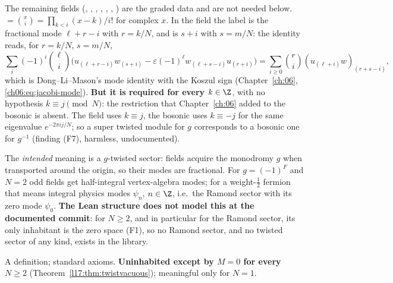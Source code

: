 \begin{dictionary}
The remaining fields (, , , ,
, , ) are the graded data and are not needed
below.  $=\binom xi=\prod_{k<i}(x-k)/i!$ for complex $x$. In the
 field the label  is the fractional mode $\ell+r-i$ with
$r=k/N$, and  is $s+i$ with $s=m/N$: the identity reads, for $r=k/N$, $s=m/N$,
\begin{equation*}
\sum_i(-1)^i\binom\ell i\bigl(u_{(\ell+r-i)}w_{(s+i)}-\varepsilon(-1)^\ell w_{(\ell+s-i)}u_{(r+i)}\bigr)
=\sum_{i\ge0}\binom ri(u_{(\ell+i)}w)_{(r+s-i)} ,
\end{equation*}
which is Dong--Li--Mason's mode identity with the Koszul sign (Chapter~\ref{ch:06},
\eqref{ch06:eq:jacobi-mode}). \textbf{But it is required for every $k\in\Z$}, with no hypothesis
$k\equiv j\pmod N$: the restriction that Chapter~\ref{ch:06} added to the bosonic
 is absent. The  field uses $k\equiv j$, the bosonic
 uses $k\equiv-j$ for the same eigenvalue $e^{-2\pi ij/N}$; so a super twisted
module for $g$ corresponds to a bosonic one for $g^{-1}$ (finding (F7), harmless, undocumented).
\end{dictionary}
\begin{physics}
The \emph{intended} meaning is a $g$-twisted sector: fields acquire the monodromy $g$ when transported
around the origin, so their modes are fractional. For $g=(-1)^F$ and $N=2$ odd fields get
half-integral vertex-algebra modes; for a weight-$\frac12$ fermion that means integral physics modes
$\psi_n$, $n\in\Z$, i.e.\ the Ramond sector with its zero mode $\psi_0$. \textbf{The Lean structure
does not model this at the documented commit}: for $N\ge2$, and in particular for the Ramond sector,
its only inhabitant is the zero space (F1), so no Ramond sector, and no twisted sector of any kind,
exists in the library.
\end{physics}
\begin{status}
A definition; standard axioms. \textbf{Uninhabited except by $M=0$ for every $N\ge2$}
(Theorem~\ref{l17:thm:twistvacuous});
meaningful only for $N=1$.
\end{status}

